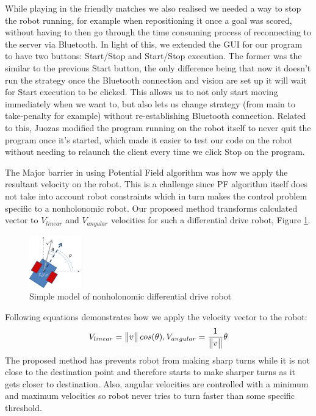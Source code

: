 \documentclass[conference,12pt]{IEEEtran}
\begin{document}
While playing in the friendly matches we also realised we needed a way to stop the robot running, for example when repositioning it once a goal was scored, without having to then go through the time consuming process of reconnecting to the server via Bluetooth. In light of this, we extended the GUI for our program to have two buttons: Start/Stop and Start/Stop execution. The former was the similar to the previous Start button, the only difference being that now it doesn't run the strategy once the Bluetooth connection and vision are set up it will wait for Start execution to be clicked. This allows us to not only start moving immediately when we want to, but also lets us change strategy (from main to take-penalty for example) without re-establishing Bluetooth connection.
Related to this, Juozas modified the program running on the robot itself to never quit the program once it's started, which made it easier to test our code on the robot without needing to relaunch the client every time we click Stop on the program.

The Major barrier in using Potential Field algorithm was how we apply the resultant velocity on the robot. This is a challenge since PF algorithm itself does not take into account robot constraints which in turn makes the control problem specific to a nonholonomic robot\cite{book:holonomicity}. Our proposed method transforms calculated vector to $V_{linear}$ and $V_{angular}$ velocities for such a differential drive robot, Figure \ref{fig:robot}.
\begin{figure}[htp]
\begin{center}
\leavevmode
\includegraphics[width=0.2\textwidth] {robot.png}
\end{center}
\caption{Simple model of nonholonomic differential drive robot}
\label{fig:robot}
\end{figure}
Following equations demonstrates how we apply the velocity vector to the robot:
\begin{align}
\label{equ:PFVelocity}
V_{linear} = \begin{Vmatrix}v\end{Vmatrix} cos(\theta) ,
V_{angular} = {1 \over \begin{Vmatrix}v\end{Vmatrix}} \theta
\end{align}
The proposed method has prevents robot from making sharp turns while it is not close to the destination point and therefore starts to make sharper turns as it gets closer to destination. Also, angular velocities are controlled with a minimum and maximum velocities so robot never tries to turn faster than some specific threshold.
\end{document}
